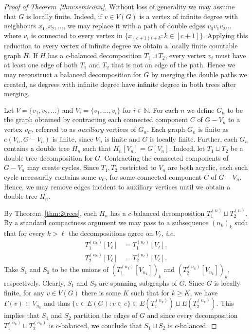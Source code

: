 \documentclass[11pt, reqno, a4paper]{article}
\theoremstyle{definition}
\numberwithin{equation}{section}
\newcommand{\N}{\mathbb{N}}
\renewcommand{\geq}{\geqslant}
\begin{document}
\begin{proof}[Proof of Theorem~\ref{thm:semiconn}]
Without loss of generality we may assume that $G$ is locally finite.
Indeed, if $v\in V(G)$ is a vertex of infinite degree with neighbours $x_1, x_2,\dotsc $, we may replace it with a path of double edges $v_0v_1v_2 
\dotsc$ where $v_i$ is connected to every vertex in $\{x_{(c+1)i+k} \colon k \in [c+1]\}$.
Applying this reduction to every vertex of infinite degree we obtain a locally finite countable graph $H$.
If $H$ has a $c$-balanced decomposition $T_1\sqcup T_2$, every vertex $v_i$ must have at least one edge of both $T_1$ and $T_2$ that is not an edge of the path.
Hence we may reconstruct a balanced decomposition for $G$ by merging the double paths we created,
as degrees with infinite degree have infinite degree in both trees after merging. 

Let $V= \{v_1, v_2,\dotsc \}$ and $V_i = \{v_1,\dotsc, v_i\}$ for $i\in \N$.
For each $n$ we define $G_n$ to be the graph obtained by contracting each connected component $C$ of $G- V_n$ to a vertex $v_C$, referred to as \emph{auxiliary} vertices of $G_n$.
Each graph $G_n$ is finite as $e(V_n, G-V_n)$ is finite, since $V_n$ is finite and $G$ is locally finite.
Further, each $G_n$ contains a double tree $H_n$ such that $H_n[V_n] = G[V_n]$.
Indeed, let $T_1\sqcup T_2$ be a double tree decomposition for $G$.
Contracting the connected components of $G-V_n$ may create cycles. 
Since $T_1,T_2$ restricted to $V_n$ are both acyclic, each such cycle necessarily contains some $v_C$, for some connected component $C$ of $G-V_n$.
Hence, we may remove edges incident to auxiliary vertices until we obtain a double tree $H_n$. 

By Theorem~\ref{thm:2trees}, each $H_n$ has a $c$-balanced decomposition $T_1^{(n)}\sqcup T_2^{(n)}$.
By a standard compactness argument we may pass to a subsequence $(n_k)_k$ such that for every $k > \ell$ the decompositions agree on $V_{\ell}$, \textit{i.e.} 
\begin{align*}
T_1^{(n_k)}[V_{\ell}] &= T_1^{(n_\ell)}[V_{\ell}],\\
T_2^{(n_k)}[V_{\ell}] &= T_2^{(n_\ell)}[V_{\ell}].
\end{align*}
Take $S_1$ and $S_2$ to be the unions of $(T_1^{(n_k)}[V_{n_k}])_k$ and $(T_2^{(n_k)}[V_{n_k}])_k$, respectively.
Clearly, $S_1$ and $S_2$ are spanning subgraphs of $G$.
Since $G$ is locally finite, for any $v\in V(G)$ there is some $K$ such that for $k\geq K$, we have $\Gamma(v) \subset V_{n_k}$ and thus $\{ e \in E(G) \colon v\in e\} \subset E(T_1^{(n_k)})\sqcup E(T_2^{(n_k)})$.
This implies that $S_1$ and $S_2$ partition the edges of $G$ and since every decomposition $T_1^{(n_k)}\sqcup T_2^{(n_k)}$ is $c$-balanced, we conclude that $S_1 \sqcup S_2$ is $c$-balanced.


\end{proof}
\end{document}
